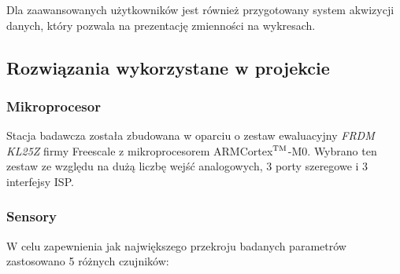 \documentclass[12pt,a4paper]{article}
\begin{document}
Dla zaawansowanych użytkowników jest również przygotowany system akwizycji danych, który pozwala na prezentację zmienności na wykresach.

\subsection{Rozwiązania wykorzystane w projekcie}
\subsubsection{Mikroprocesor}
Stacja badawcza została zbudowana w oparciu o zestaw ewaluacyjny \textit{FRDM KL25Z} firmy Freescale z mikroprocesorem ARM\textregistered Cortex$^{\textsc{TM}}$-M0. Wybrano ten zestaw ze względu na dużą liczbę wejść analogowych, 3 porty szeregowe i 3 interfejsy ISP.
\subsubsection{Sensory}
W celu zapewnienia jak największego przekroju badanych parametrów zastosowano 5 różnych czujników:
\end{document}
